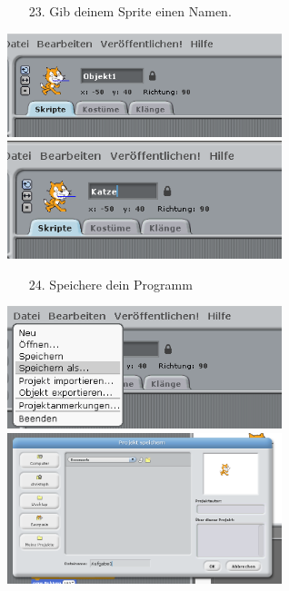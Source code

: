 \begin{itemize}
\item[23.] Gib deinem Sprite einen Namen.
\end{itemize}
\includegraphics[width=0.6\textwidth]{images/aufgabe1_name_aendern_alt.png} \newline
\includegraphics[width=0.6\textwidth]{images/aufgabe1_name_aendern.png}
\begin{itemize}
\newpage
\item[24.] Speichere dein Programm
\end{itemize}
\includegraphics[width=0.6\textwidth]{images/aufgabe1_name_speichern1.png} \newline
\includegraphics[width=0.6\textwidth]{images/aufgabe1_name_speichern2.png}